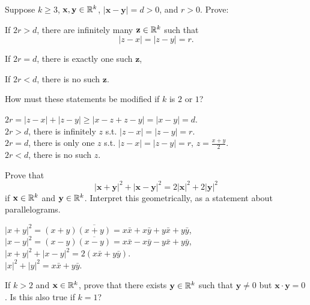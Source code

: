 \begin{myexercise}
    \label{ex:1.16}
    Suppose $k \geq 3$, $\mathbf{x}, \mathbf{y} \in {\protect\mathbb R}^k$, $|\mathbf{x} - \mathbf{y}| =d>0$, and $r >0$. Prove:
    \begin{asparaenum}[(a)]
        \item If $2r > d$, there are infinitely many $\mathbf{z} \in {\protect\mathbb R}^k$ such that
        \begin{equation*}
            |z-x| =|z-y| =r.
        \end{equation*}        
        \item If $2r = d$, there is exactly one such $\mathbf{z}$,
        \item If $2r < d$, there is no such $\mathbf{z}$.
    \end{asparaenum}
    How must these statements be modified if $k$ is $2$ or $1$?
\end{myexercise}

\mySolve
$2r = |z-x|+|z-y| \geq |x-z+z-y| = |x-y| = d$.\\
$2r > d$, there is infinitely $z$ s.t. $|z-x| =|z-y| =r$.\\
$2r = d$, there is only one $z$ s.t. $|z-x| =|z-y| =r$, $z = \frac{x+y}{2}$.\\
$2r < d$, there is no such $z$.


\begin{myexercise}
    \label{ex:1.17}
    Prove that
    \begin{equation*}
        |\mathbf{x} + \mathbf{y}|^2 + 
        |\mathbf{x} - \mathbf{y}|^2 =
        2|\mathbf{x}|^2 + 2|\mathbf{y}|^2
    \end{equation*}
    if $\mathbf{x} \in {\protect\mathbb R}^k$ and $\mathbf{y} \in {\protect\mathbb R}^k$. Interpret this geometrically, as a statement about parallelograms.
\end{myexercise}

\mySolve
$|x+y|^2 = (x+y)\overline{(x+y)} = x\bar{x} + x\bar{y} + y\bar{x} + y\bar{y}$, \\
$|x-y|^2 = (x-y)\overline{(x-y)} = x\bar{x} - x\bar{y} - y\bar{x} + y\bar{y}$, \\
$|x+y|^2 + |x-y|^2 = 2(x\bar{x} + y\bar{y})$. \\
$|x|^2 + |y|^2 = x\bar{x} + y\bar{y}$.


\begin{myexercise}
    \label{ex:1.18}
    If $k >2$ and $\mathbf{x}\in {\protect\mathbb R}^k$, prove that there exists $\mathbf{y} \in {\protect\mathbb R}^k$ such that $\mathbf{y} \neq 0$ but $\mathbf{x}\cdot\mathbf{y} =0$.
    Is this also true if $k =1$?
\end{myexercise}

